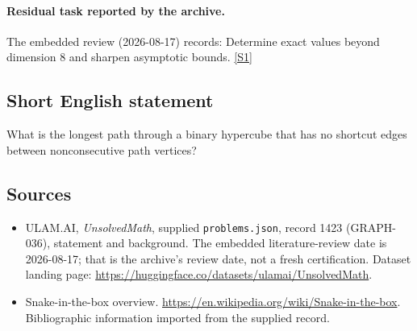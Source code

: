 \documentclass[11pt,a4paper]{article}
\newcommand{\sref}[2]{\hyperlink{source:#1:#2}{[S#2]}}
\begin{document}
\paragraph{Residual task reported by the archive.}

The embedded review (2026-08-17) records: Determine exact values beyond dimension 8 and sharpen asymptotic bounds. \sref{1423}{1}

\subsection{Short English statement}

What is the longest path through a binary hypercube that has no shortcut edges between nonconsecutive path vertices?

\subsection{Sources}

{\small

\begin{itemize}

\item[\hypertarget{source:1423:1}{S1}] ULAM.AI, \emph{UnsolvedMath}, supplied \texttt{problems.json}, record 1423 (GRAPH-036), statement and background. The embedded literature-review date is 2026-08-17; that is the archive’s review date, not a fresh certification. Dataset landing page: \url{https://huggingface.co/datasets/ulamai/UnsolvedMath}.

\item[\hypertarget{source:1423:2}{S2}] Snake-in-the-box overview. \url{https://en.wikipedia.org/wiki/Snake-in-the-box}. Bibliographic information imported from the supplied record.

\end{itemize}

}

\label{end:1423}
\end{document}
